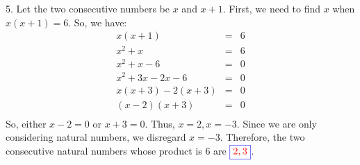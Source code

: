 \documentclass[addpoints, 12pt]{exam}
\theoremstyle{remark}
\begin{document}
5. Let the two consecutive numbers be $x$ and $x+1$. First, we need to find $x$ when $x(x+1) = 6$. So, we have:
\begin{eqnarray*}
    x(x+1) & = & 6 \\
    x^2 + x & = & 6 \\
    x^2 + x - 6 & = & 0 \\
    x^2 + 3x - 2x - 6 & = & 0 \\
    x(x+3) - 2(x+3) & = & 0 \\
    (x-2)(x+3) & = & 0 \\
\end{eqnarray*}
So, either $x-2=0$ or $x+3=0$. Thus, $x = 2, x=-3$. Since we are only considering natural numbers, we disregard $x=-3$. Therefore, the two consecutive natural numbers whose product is 6 are {\boldmath $\textcolor{blue}{\boxed{\textcolor{red}{2, 3}}}$}.
\newline
\end{document}
